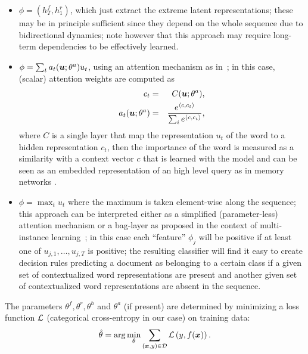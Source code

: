 \begin{itemize}
\item $\phi=(h^f_T,h^r_1)$, which just
  extract the extreme latent representations; these may be in
  principle sufficient since they depend on the whole sequence due to
  bidirectional dynamics; note however that this approach may require
  long-term dependencies to be effectively learned.
\item
  $\phi = \sum_t a_t(\bm{u};\theta^a) u_t$,
  using an attention mechanism as in~\cite{yang_hierarchical_2016}; in
  this case, (scalar) attention weights are computed as
  \begin{align*}
    c_t&=&C(\bm{u};\theta^a),\\
    a_t(\bm{u};\theta^a) &=& \frac{e^{\langle c, c_t\rangle}}
    {\sum_i{e^{\langle c, c_i\rangle}}},\\
  \end{align*}
  where $C$ is a single layer that map the representation $u_t$ of the
  word to a hidden representation $c_t$, then the importance of the word is
  measured as a similarity with a context vector $c$ that is learned
  with the model and can be seen as an embedded representation of an
  high level query as in memory networks \cite{sukhbaatar2015end}.
\item $\phi = \max_t u_t$ where the maximum is taken element-wise
  along the sequence; this approach can be interpreted either as a
  simplified (parameter-less) attention mechanism or a bag-layer as
  proposed in the context of multi-instance
  learning~\cite{tibo2017network}; in this case each ``feature''
  $\phi_j$ will be positive if at least one of $u_{j,1},\dots,u_{j,T}$
  is positive; the resulting classifier will find it easy to create
  decision rules predicting a document as belonging to a certain class
  if a given set of contextualized word representations are present
  and another given set of contextualized word representations are
  absent in the sequence.
\end{itemize}

The parameters $\theta^f,\theta^r,\theta^h$ and $\theta^a$ (if
present) are determined by minimizing a loss function $\mathcal{L}$
(categorical cross-entropy in our case) on training data:
\begin{equation}
  \hat \theta = \mathrm{arg}\min_\theta\sum_{(\bm{x},y)\in\mathcal{D}}\mathcal{L}\left(y,f(\bm{x})\right).
\end{equation}


